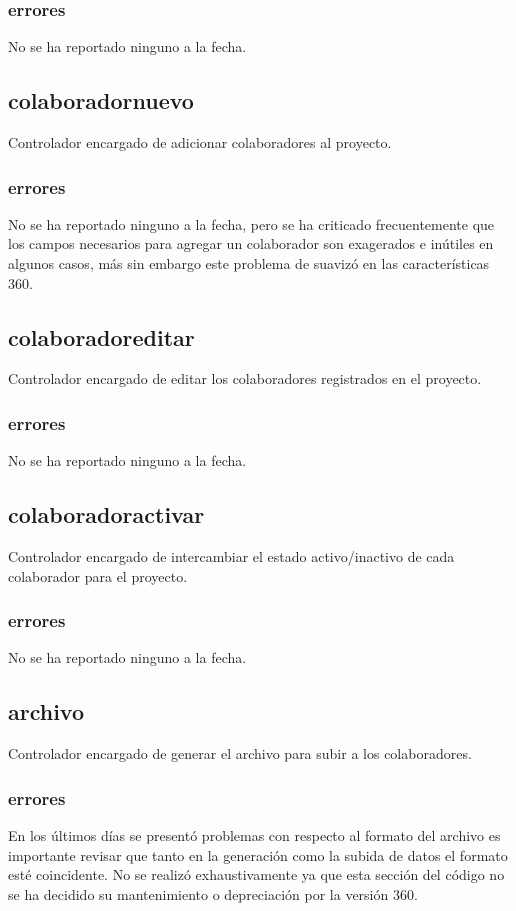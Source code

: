 \documentclass[10pt,a4paper]{book}
\begin{document}
	\subsubsection{errores}
	No se ha reportado ninguno a la fecha.


	\subsection{colaboradornuevo}
	Controlador encargado de adicionar colaboradores al proyecto.
	\subsubsection{errores}
	No se ha reportado ninguno a la fecha, pero se ha criticado frecuentemente que los campos necesarios para agregar un colaborador son exagerados e inútiles en algunos casos, más sin embargo este problema de suavizó en las características 360.

	\subsection{colaboradoreditar}
	Controlador encargado de editar los colaboradores registrados en el proyecto.
	\subsubsection{errores}
	No se ha reportado ninguno a la fecha.

	\subsection{colaboradoractivar}
	Controlador encargado de intercambiar el estado activo/inactivo de cada colaborador para el proyecto.
	\subsubsection{errores}
	No se ha reportado ninguno a la fecha.

	\subsection{archivo}
	Controlador encargado de generar el archivo para subir a los colaboradores.
	\subsubsection{errores}\label{e_archivo}
	En los últimos días se presentó problemas con respecto al formato del archivo es importante revisar que tanto en la generación como la subida de datos el formato esté coincidente. No se realizó exhaustivamente ya que esta sección del código no se ha decidido su mantenimiento o depreciación por la versión 360.
\end{document}

